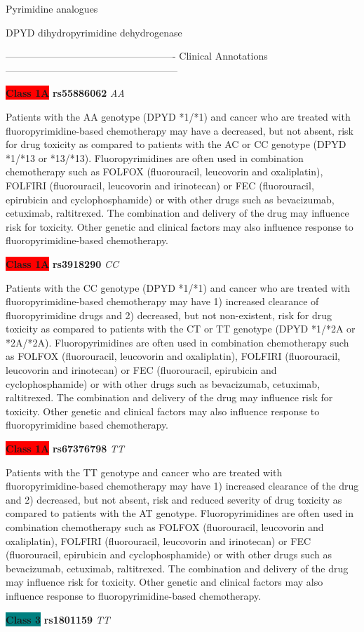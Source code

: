 \documentclass{resume} %
\begin{document}
\begin{rSection}{ Pyrimidine analogues }
\begin{rSubsection}{ DPYD }{ dihydropyrimidine dehydrogenase }{}{}
\item[] ---------------------------------------------------- Clinical Annotations -----------------------------------------------------\newline
\item \textbf{\colorbox{red} {Class 1A}} \textbf{ rs55886062 } \textit{ AA }
\item[] Patients with the AA genotype (DPYD *1/*1) and cancer who are treated with fluoropyrimidine-based chemotherapy may have a decreased, but not absent, risk for drug toxicity as compared to patients with the AC or CC genotype (DPYD *1/*13 or *13/*13). Fluoropyrimidines are often used in combination chemotherapy such as FOLFOX (fluorouracil, leucovorin and oxaliplatin), FOLFIRI (fluorouracil, leucovorin and irinotecan) or FEC (fluorouracil, epirubicin and cyclophosphamide) or with other drugs such as bevacizumab, cetuximab, raltitrexed. The combination and delivery of the drug may influence risk for toxicity. Other genetic and clinical factors may also influence response to fluoropyrimidine-based chemotherapy.\item \textbf{\colorbox{red} {Class 1A}} \textbf{ rs3918290 } \textit{ CC }
\item[] Patients with the CC genotype (DPYD *1/*1) and cancer who are treated with fluoropyrimidine-based chemotherapy may have 1) increased clearance of fluoropyrimidine drugs and 2) decreased, but not non-existent, risk for drug toxicity as compared to patients with the CT or TT genotype (DPYD *1/*2A or *2A/*2A). Fluoropyrimidines are often used in combination chemotherapy such as FOLFOX (fluorouracil, leucovorin and oxaliplatin), FOLFIRI (fluorouracil,  leucovorin and irinotecan) or FEC (fluorouracil, epirubicin and cyclophosphamide) or with other drugs such as bevacizumab, cetuximab, raltitrexed. The combination and delivery of the drug may influence risk for toxicity. Other genetic and clinical factors may also influence response to fluoropyrimidine based chemotherapy.\item \textbf{\colorbox{red} {Class 1A}} \textbf{ rs67376798 } \textit{ TT }
\item[] Patients with the TT genotype and cancer who are treated with fluoropyrimidine-based chemotherapy may have 1) increased clearance of the drug and 2) decreased, but not absent, risk and reduced severity of drug toxicity as compared to patients with the AT genotype. Fluoropyrimidines are often used in combination chemotherapy such as FOLFOX (fluorouracil, leucovorin and oxaliplatin), FOLFIRI (fluorouracil, leucovorin and irinotecan) or FEC (fluorouracil, epirubicin and cyclophosphamide) or with other drugs such as bevacizumab, cetuximab, raltitrexed. The combination and delivery of the drug may influence risk for toxicity. Other genetic and clinical factors may also influence response to fluoropyrimidine-based chemotherapy.\item \textbf{\colorbox{teal} {Class 3}} \textbf{ rs1801159 } \textit{ TT }

\end{rSubsection}
\end{rSection}
\end{document}
